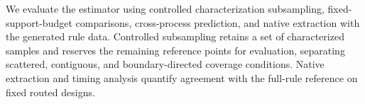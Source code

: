 We evaluate the estimator using controlled characterization subsampling,
fixed-support-budget comparisons, cross-process prediction, and native
extraction with the generated rule data. Controlled subsampling retains a set of
characterized samples and reserves the remaining reference points for evaluation,
separating scattered, contiguous, and boundary-directed coverage conditions.
Native extraction and timing analysis quantify agreement with the full-rule
reference on fixed routed designs.

